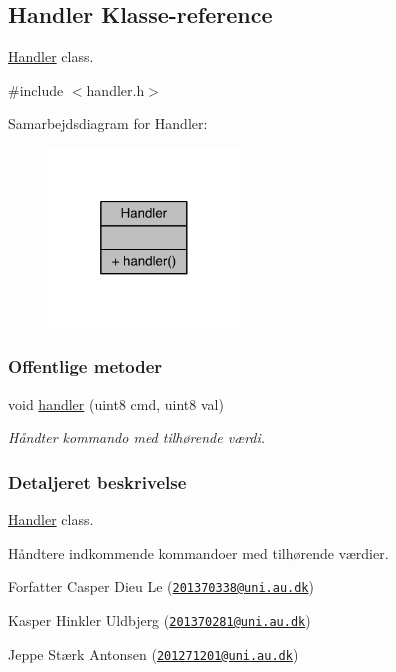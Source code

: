 \hypertarget{class_handler}{}\subsection{Handler Klasse-\/reference}
\label{class_handler}


\hyperlink{class_handler}{Handler} class.  




{\ttfamily \#include $<$handler.\+h$>$}



Samarbejdsdiagram for Handler\+:
\nopagebreak
\begin{figure}[H]
\begin{center}
\leavevmode
\includegraphics[width=145pt]{d9/de1/class_handler__coll__graph}
\end{center}
\end{figure}
\subsubsection*{Offentlige metoder}
\begin{DoxyCompactItemize}
\item 
void \hyperlink{class_handler_af5be5b016b862943cd22504490acc8f4}{handler} (uint8 cmd, uint8 val)
\begin{DoxyCompactList}\small\item\em Håndter kommando med tilhørende værdi. \end{DoxyCompactList}\end{DoxyCompactItemize}


\subsubsection{Detaljeret beskrivelse}
\hyperlink{class_handler}{Handler} class. 

Håndtere indkommende kommandoer med tilhørende værdier. \begin{DoxyAuthor}{Forfatter}
Casper Dieu Le (\href{mailto:201370338@uni.au.dk}{\tt 201370338@uni.\+au.\+dk}) 

Kasper Hinkler Uldbjerg (\href{mailto:201370281@uni.au.dk}{\tt 201370281@uni.\+au.\+dk}) 

Jeppe Stærk Antonsen (\href{mailto:201271201@uni.au.dk}{\tt 201271201@uni.\+au.\+dk}) 
\end{DoxyAuthor}


